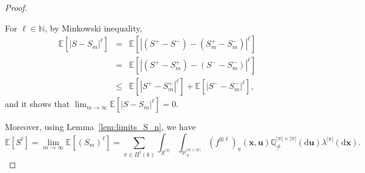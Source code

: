 \documentclass{article}
\theoremstyle{definition}
\numberwithin{equation}{section}
\theoremstyle{remark}
\newcommand{\E}{\mathbb{E}}
\newcommand{\N}{\mathbb{N}}
\begin{document}
\begin{proof}
\begin{enumerate}
For $\ell\in\N$, by Minkowski inequality, 
\begin{eqnarray*}
    \E\left[\left|S-S_m\right|^{\ell}\right]&=&\E\left[\left|(S^+-S^-)-(S_m^+-S_m^-)\right|^{\ell}\right]\\
    &=&\E\left[\left|(S^+-S_m^+)-(S^--S_m^-)\right|^{\ell}\right]\\
    &\le&\E\left[\left|S^+-S_m^+\right|^{\ell}\right]+\E\left[\left|S^--S_m^-\right|^{\ell}\right],
\end{eqnarray*}
and it shows that $\lim_{m\to\infty}\E\left[\left|S-S_m\right|^{\ell}\right]=0$.
\end{enumerate}
Moreover, using Lemma~\ref{lem:limits_S_n}, we have 
\begin{equation}
\E[S^\ell]=\lim_{m\to\infty}\E[(S_m)^\ell]=\sum_{\pi\in\Pi^\ell(k)}\int_{\mathbb{X}^{|\pi|}}\int_{\mathbb{M}^{|\pi|\times|\pi|}_{\ne}}(f^{\otimes\ell})_{\pi}(\bm{x},\bm{u})\mathbb{Q}^{|\pi|\times|\pi|}_{\ne}(\mathrm{d}\bm{u})\lambda^{|\pi|}(\mathrm{d}\bm{x}).
\end{equation}
\end{proof}
\end{document}
